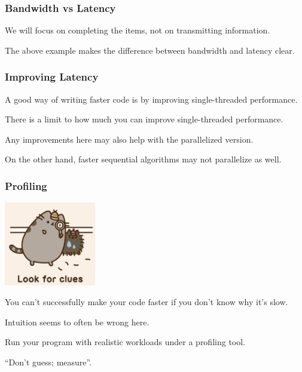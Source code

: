 \begin{frame}
\frametitle{Bandwidth vs Latency}


\begin{center}
\end{center}

We will focus on completing the items, not on transmitting information.

The above example makes the difference between bandwidth and latency clear.

\end{frame}


\begin{frame}
\frametitle{Improving Latency}

A good way of writing faster code is by improving single-threaded 
performance. 

There is a limit to how much you can
improve single-threaded performance.

Any improvements here
may also help with the parallelized version. 

On the other hand, faster
sequential algorithms may not parallelize as well. 


\end{frame}




\begin{frame}
\frametitle{Profiling}

\begin{center}
	\includegraphics[width=0.3\textwidth]{images/clues.png}
\end{center}

You can't successfully make your code 
faster if you don't know why it's slow. 

Intuition seems to often be
wrong here. 

Run your program with realistic workloads under a profiling tool.

``Don't guess; measure''.

\end{frame}


